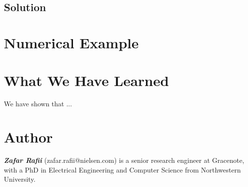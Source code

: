 \documentclass[journal]{IEEEtran}
\begin{document}
\subsection{Solution}




\section{Numerical Example}




\section{What We Have Learned}

We have shown that ...



\section{Author}

\textit{\textbf{Zafar Rafii}} (zafar.rafii@nielsen.com) is a senior research engineer at Gracenote, with a PhD in Electrical Engineering and Computer Science from Northwestern University.




\end{document}
